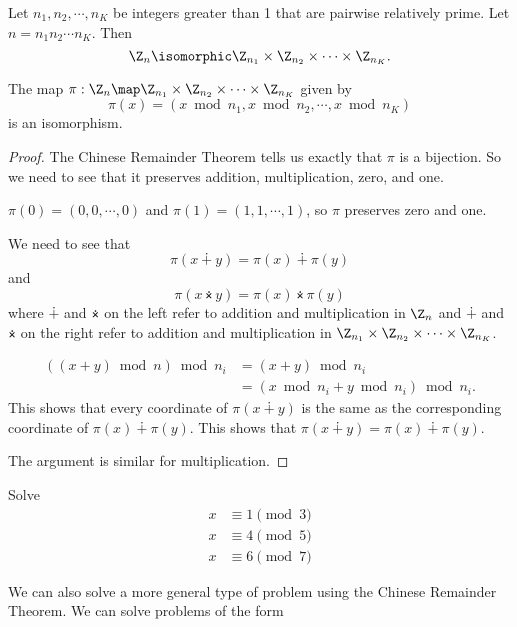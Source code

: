 \documentclass[oneside,12pt]{amsart}
\begin{document}
\begin{theorem}
Let $n_1,n_2,\cdots,n_K$ be integers greater
than 1 that are pairwise relatively prime. Let $n=n_1 n_2 \cdots n_K$. Then
$$\Z_n \isomorphic \Z_{n_1} \times \Z_{n_2} \times \cdots \times \Z_{n_K}.$$

The map $\pi:\Z_n \map \Z_{n_1} \times \Z_{n_2} \times \cdots \times \Z_{n_K}$ given by
$$\pi(x) = \left(x \bmod n_1, x\bmod n_2, \cdots , x\bmod n_K\right)$$
is an isomorphism.
\end{theorem}
\begin{proof}
The Chinese Remainder Theorem tells us exactly that $\pi$ is a bijection. So we need to
see that it preserves addition, multiplication, zero, and one.

\bigskip

$\pi(0) = (0,0,\cdots,0)$ and $\pi(1) = (1,1,\cdots, 1)$, so $\pi$ preserves zero and one.

\bigskip

We need to see that
$$\pi(x\dotplus y) =  \pi(x) \dotplus \pi(y)$$
and
$$\pi(x\dottimes y) = \pi(x) \dottimes \pi(y) $$
where $\dotplus$ and $\dottimes$ on the left refer to addition and multiplication in $\Z_n$ and
$\dotplus$ and $\dottimes$ on the right refer to addition and multiplication in
$\Z_{n_1} \times \Z_{n_2} \times \cdots \times \Z_{n_K}$.

\bigskip

\begin{align*}
\left( (x+y) \bmod n \right) \bmod n_i  &= (x+y) \bmod n_i \\
  &= (x \bmod n_i + y \bmod n_i) \bmod n_i.
\end{align*}
This shows that every coordinate of $\pi(x\dotplus y)$ is the same as the corresponding coordinate of
$\pi(x) \dotplus \pi(y)$. This shows that $\pi(x\dotplus y) =  \pi(x) \dotplus \pi(y)$.

The argument is similar for multiplication.
\end{proof}

\begin{in_class_example}
Solve
\begin{align*}
x &\equiv 1 \pmod 3 \\
x &\equiv 4 \pmod 5 \\
x &\equiv 6 \pmod 7
\end{align*}
\end{in_class_example}

We can also solve a more general type of problem using the Chinese Remainder Theorem. We can solve problems of the form
\end{document}
